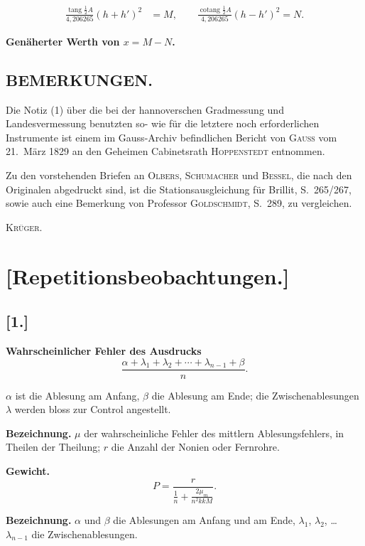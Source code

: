 \documentclass[12pt,a4paper]{article}
\DeclareMathOperator{\tang}{tang}
\DeclareMathOperator{\cotang}{cotang}
\theoremstyle{plain}
\theoremstyle{definition}
\theoremstyle{remark}
\begin{document}
\begin{align*}
\frac{\tang\frac12 A}{4{,}206265}(h+h')^2 &= M, \qquad
\frac{\cotang\frac12 A}{4{,}206265}(h-h')^2 = N.
\end{align*}

\noindent
\textbf{Genäherter Werth von $x = M - N$.}

\newpage
\subsection*{BEMERKUNGEN.}

Die Notiz (1) über die bei der hannoverschen Gradmessung und Landesvermessung benutzten so-
wie für die letztere noch erforderlichen Instrumente ist einem im Gauss-Archiv befindlichen Bericht
von \textsc{Gauss} vom 21.\ März 1829 an den Geheimen Cabinetsrath \textsc{Hoppenstedt} entnommen.

Zu den vorstehenden Briefen an \textsc{Olbers}, \textsc{Schumacher} und \textsc{Bessel}, die nach den Originalen
abgedruckt sind, ist die Stationsausgleichung für Brillit, S.\ 265/267, sowie auch eine Bemerkung von
Professor \textsc{Goldschmidt}, S.\ 289, zu vergleichen.

\hfill\textsc{Krüger.}

\newpage
\section*{[Repetitionsbeobachtungen.]}

\subsection*{[1.]}

\textbf{Wahrscheinlicher Fehler des Ausdrucks}
\[\frac{\alpha + \lambda_1 + \lambda_2 + \cdots + \lambda_{n-1} + \beta}{n}.\]

\noindent
$\alpha$ ist die Ablesung am Anfang, $\beta$ die Ablesung am Ende; die Zwischenablesungen $\lambda$
werden bloss zur Control angestellt.

\medskip
\noindent
\textbf{Bezeichnung.} $\mu$ der wahrscheinliche Fehler des mittlern Ablesungsfehlers,
in Theilen der Theilung; $r$ die Anzahl der Nonien oder Fernrohre.

\medskip
\noindent
\textbf{Gewicht.}
\[P = \frac{r}{\frac{1}{n} + \frac{2\mu_m}{n^2 kkM}}.\]

\medskip
\noindent
\textbf{Bezeichnung.} $\alpha$ und $\beta$ die Ablesungen am Anfang und am Ende,
$\lambda_1$, $\lambda_2$, \ldots\ $\lambda_{n-1}$ die Zwischenablesungen.
\end{document}
